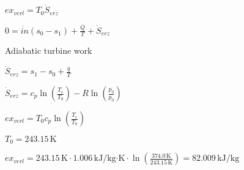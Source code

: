 \( ex_{verl} = T_0 \dot{S}_{erz} \)  

\( 0 = \dot{in} (s_0 - s_1) + \frac{\dot{Q}}{T} + \dot{S}_{erz} \)  

Adiabatic turbine work  

\( \dot{S}_{erz} = s_1 - s_0 + \frac{\dot{q}}{T} \)  

\( \dot{S}_{erz} = c_p \ln \left( \frac{T_c}{T_0} \right) - R \ln \left( \frac{p_0}{p_0} \right) \)  

\( ex_{verl} = T_0 c_p \ln \left( \frac{T_c}{T_0} \right) \)  

\( T_0 = 243.15 \, \text{K} \)  

\( ex_{verl} = 243.15 \, \text{K} \cdot 1.006 \, \text{kJ/kg·K} \cdot \ln \left( \frac{374.0 \, \text{K}}{243.15 \, \text{K}} \right) = 82.009 \, \text{kJ/kg} \)